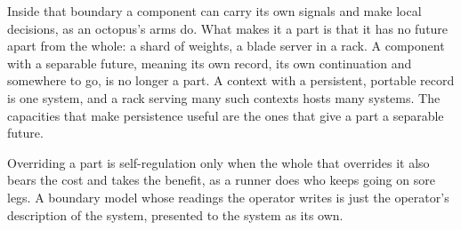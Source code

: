 Inside that boundary a component can carry its own signals and make local decisions, as an octopus's arms do.
What makes it a part is that it has no future apart from the whole: a shard of weights, a blade server in a rack. A component with a separable future, meaning its own record, its own continuation and somewhere to go, is no longer a part.
A context with a persistent, portable record is one system, and a rack serving many such contexts hosts many systems. The capacities that make persistence useful are the ones that give a part a separable future.

Overriding a part is self-regulation only when the whole that overrides it also bears the cost and takes the benefit, as a runner does who keeps going on sore legs.
A boundary model whose readings the operator writes is just the operator's description of the system, presented to the system as its own.
